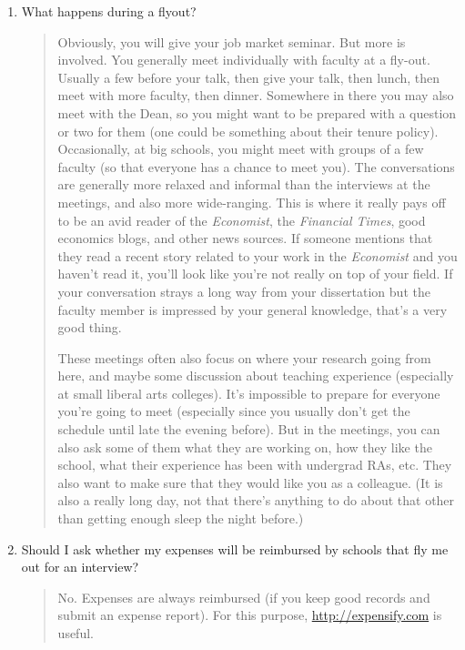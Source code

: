 \documentclass{\classes/econtex}
\begin{document}
\begin{enumerate}
\item  What happens during a flyout?
  \begin{quote}
    Obviously, you will give your job market seminar.  But more is
    involved.  You generally meet individually with faculty at a
    fly-out.  Usually a few before your talk, then give your talk, then
    lunch, then meet with more faculty, then dinner.  Somewhere in there
    you may also meet with the Dean, so you might want to be prepared
    with a question or two for them (one could be something about
    their tenure policy).  Occasionally, at big schools, you might meet
    with groups of a few faculty (so that everyone has a chance to meet
    you).  The conversations are generally more relaxed and informal
    than the interviews at the meetings, and also more wide-ranging.
    This is where it really pays off to be an avid reader of the \textit{Economist},
    the \textit{Financial Times}, good economics blogs, and other news sources.
    If someone mentions that they read a recent story related to your 
    work in the \textit{Economist} and you haven't read it, you'll look like
    you're not really on top of your field.  If your conversation strays
    a long way from your dissertation but the faculty member is impressed 
    by your general knowledge, that's a very good thing.

    These meetings often also focus on where your research going from
    here, and maybe some discussion about teaching experience (especially
    at small liberal arts colleges).  It's impossible to prepare for
    everyone you're going to meet (especially since you usually don't get
    the schedule until late the evening before).  But in the meetings, you
    can also ask some of them what they are working on, how they like the
    school, what their experience has been with undergrad RAs, etc.  They
    also want to make sure that they would like you as a colleague.  (It is
    also a really long day, not that there's anything to do about that other
    than getting enough sleep the night before.)



  \end{quote}

\item  Should I ask whether my expenses will be reimbursed by schools that fly me out for an interview?
  \begin{quote}
    No.  Expenses are always reimbursed (if you keep good records and submit an expense report).  For this purpose, \url{http://expensify.com} is useful.


\end{quote}
\end{enumerate}
\end{document}
